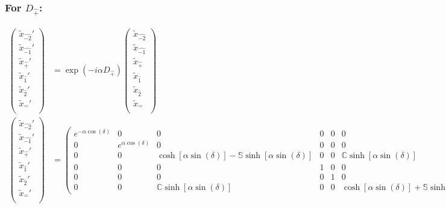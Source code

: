 \documentclass[]{article}
\numberwithin{equation}{section}
\begin{document}
{{\subsubsection{For $D_{\hat{+}}$:}
\begin{align}
\begin{pmatrix}
    \tilde{x}_{\hat{-2}}'\\
    \tilde{x}_{\hat{-1}}'\\
    \tilde{x}_{\hat{+}}'\\
    \tilde{x}_{\hat{1}}'\\
    \tilde{x}_{\hat{2}}'\\
    \tilde{x}_{\hat{-}}'\\
    \end{pmatrix}&= \exp{(-i\alpha D_{\hat{+}})}\begin{pmatrix}
    \tilde{x}_{\hat{-2}}\\
    \tilde{x}_{\hat{-1}}\\
    \tilde{x}_{\hat{+}}\\
    \tilde{x}_{\hat{1}}\\
    \tilde{x}_{\hat{2}}\\
    \tilde{x}_{\hat{-}}\\
    \end{pmatrix}\\
    \begin{pmatrix}
    \tilde{x}_{\hat{-2}}'\\
    \tilde{x}_{\hat{-1}}'\\
    \tilde{x}_{\hat{+}}'\\
    \tilde{x}_{\hat{1}}'\\
    \tilde{x}_{\hat{2}}'\\
    \tilde{x}_{\hat{-}}'\\
    \end{pmatrix}&= \begin{pmatrix}
        e^{-\alpha\cos{(\delta)}}&0&0&0&0&0\\
        0&e^{\alpha\cos{(\delta)}}&0&0&0&0\\
        0&0&\cosh[\alpha\sin{(\delta)}]-\mathbb{S}\sinh[\alpha\sin{(\delta)}]&0&0&\mathbb{C}\sinh[\alpha\sin{(\delta)}]\\
        0&0&0&1&0&0\\
        0&0&0&0&1&0\\
        0&0&\mathbb{C}\sinh[\alpha\sin{(\delta)}]&0&0&\cosh[\alpha\sin{(\delta)}]+\mathbb{S}\sinh[\alpha\sin{(\delta)}]
    \end{pmatrix}\begin{pmatrix}

\end{pmatrix}
\end{align}}}
\end{document}
